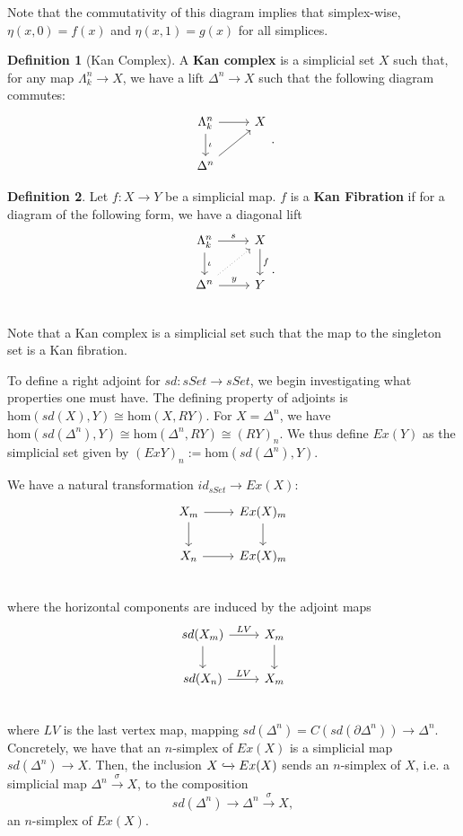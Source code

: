 \documentclass{article}
\theoremstyle{definition}
\newtheorem{defn}{Definition}[section]
\begin{document}
    Note that the commutativity of this diagram implies that simplex-wise, $\eta(x,0)=f(x)$ and $\eta(x,1)=g(x)$ for all simplices. 
    
    
    
    
    \begin{defn}[Kan Complex]
    A \textbf{Kan complex} is a simplicial set $X$ such that, for any map $\Lambda^{n}_{k}\rightarrow X$, we have a lift $\Delta^{n}\rightarrow X$ such that the following diagram commutes:
    \[
    \begin{tikzcd}
    \Lambda^{n}_{k}\arrow[d,"\iota"]\arrow[r] & X\\
    \Delta^{n}\arrow[ur]
    \end{tikzcd}.
    \]
    \end{defn}
    \begin{defn}
    Let $f:X\rightarrow Y$ be a simplicial map. $f$ is a \textbf{Kan Fibration} if for a diagram of the following form, we have a diagonal lift
     \[
    \begin{tikzcd}
    \Lambda^{n}_{k}\arrow[d,"\iota"]\arrow[r,"s"] & X\arrow[d,"f"]\\
    \Delta^{n}\arrow[ur,dotted]\arrow[r,"y"] & Y\\
    \end{tikzcd}.
    \]
 Note that a Kan complex is a simplicial set such that the map to the singleton set is a Kan fibration. 
    \end{defn}
    
    To define a right adjoint for $sd:sSet\rightarrow sSet$, we begin investigating what properties one must have. The defining property of adjoints is $\text{hom}(sd(X),Y)\cong \text{hom}(X,RY)$. For $X=\Delta^{n}$, we have $\text{hom}(sd(\Delta^{n}),Y)\cong \text{hom}(\Delta^{n},RY)\cong (RY)_{n}.$ We thus define $Ex(Y)$ as the simplicial set given by $(ExY)_{n}:=\text{hom}(sd(\Delta^{n}),Y)$.
    
We have a natural transformation $id_{sSet}\rightarrow Ex(X)$:
\[
\begin{tikzcd}
X_{m}\arrow[d]\arrow[r] & Ex(X)_{m}\arrow[d]\\
X_{n}\arrow[r] & Ex(X)_{m}\\
\end{tikzcd}
\]
where the horizontal components are induced by the adjoint maps
\[
\begin{tikzcd}
sd(X_{m})\arrow[d,]\arrow[r,"LV"] & X_{m}\arrow[d]\\
sd(X_{n})\arrow[r,"LV"] & X_{m}\\
\end{tikzcd}
\]
where $LV$ is the last vertex map, mapping $sd(\Delta^{n})=C(sd(\partial\Delta^{n}))\rightarrow\Delta^{n}.$ Concretely, we have that an $n$-simplex of $Ex(X)$ is a simplicial map $sd(\Delta^{n})\rightarrow X$. Then, the inclusion $X\xhookrightarrow{}Ex(X)$ sends an $n$-simplex of $X$, i.e. a simplicial map $\Delta^{n}\xrightarrow{\sigma} X$, to the composition
\[sd(\Delta^{n})\rightarrow\Delta^{n}\xrightarrow{\sigma}X, \] an $n$-simplex of $Ex(X).$
\end{document}
